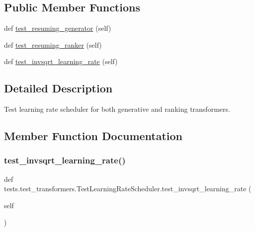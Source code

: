 \subsection*{Public Member Functions}
\begin{DoxyCompactItemize}
\item 
def \hyperlink{classtests_1_1test__transformers_1_1TestLearningRateScheduler_a8c89a354321034bd5717b8e1907cbfeb}{test\+\_\+resuming\+\_\+generator} (self)
\item 
def \hyperlink{classtests_1_1test__transformers_1_1TestLearningRateScheduler_a1f6f7d394258d2170c3005e6dffae8a7}{test\+\_\+resuming\+\_\+ranker} (self)
\item 
def \hyperlink{classtests_1_1test__transformers_1_1TestLearningRateScheduler_aecccd2d60496f6fcd1fd94846fc5ac3c}{test\+\_\+invsqrt\+\_\+learning\+\_\+rate} (self)
\end{DoxyCompactItemize}


\subsection{Detailed Description}
\begin{DoxyVerb}Test learning rate scheduler for both generative and ranking transformers.
\end{DoxyVerb}
 

\subsection{Member Function Documentation}
\mbox{\label{classtests_1_1test__transformers_1_1TestLearningRateScheduler_aecccd2d60496f6fcd1fd94846fc5ac3c}} 
\subsubsection{\texorpdfstring{test\+\_\+invsqrt\+\_\+learning\+\_\+rate()}{test\_invsqrt\_learning\_rate()}}
{\footnotesize\ttfamily def tests.\+test\+\_\+transformers.\+Test\+Learning\+Rate\+Scheduler.\+test\+\_\+invsqrt\+\_\+learning\+\_\+rate (\begin{DoxyParamCaption}\item[{}]{self }\end{DoxyParamCaption})}

